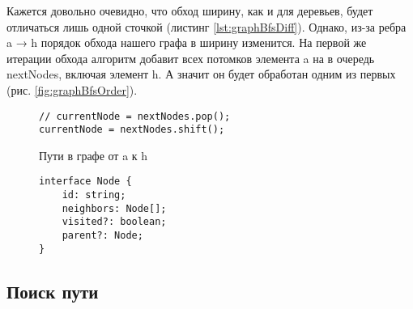 \documentclass[../../article.tex]{subfiles}
\begin{document}
Кажется довольно очевидно, что обход ширину, как и для деревьев, будет отличаться лишь одной сточкой (листинг \ref{lst:graphBfsDiff}). Однако, из-за ребра {\firacodebold a → h} порядок обхода нашего графа в ширину изменится. На первой же итерации обхода алгоритм добавит всех потомков элемента {\firacodebold a} на в очередь {\firacodebold nextNodes}, включая элемент {\firacodebold h}. А значит он будет обработан одним из первых (рис. \ref{fig:graphBfsOrder}).

\begin{figure}
    \begin{ruledelement}
        \begin{lstlisting}[caption={Отличие обхода в ширину от обхода в глубину}, label={lst:graphBfsDiff}]
// currentNode = nextNodes.pop();
currentNode = nextNodes.shift();
        \end{lstlisting}
    \end{ruledelement}
\end{figure}

\begin{figure}
    \caption{Пути в графе от {\firacodebold a} к {\firacodebold h}}
    \label{fig:pathExposure}
\end{figure}

\begin{figure}
    \begin{ruledelement}
        \begin{lstlisting}[caption={Структура вершины графа для поиска пути}, label={lst:graphStructureSimplePath}]
interface Node {
    id: string;
    neighbors: Node[];
    visited?: boolean;
    parent?: Node;
}
        \end{lstlisting}
    \end{ruledelement}
\end{figure}

\subsection{Поиск пути}
\end{document}
